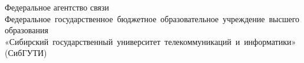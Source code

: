 \begin{center}
    Федеральное агентство связи \\
    \hbox{Федеральное государственное бюджетное образовательное учреждение высшего}
    образования \\
    \hbox{«Сибирский государственный университет телекоммуникаций и информатики»}
    (СибГУТИ)
\end{center}
